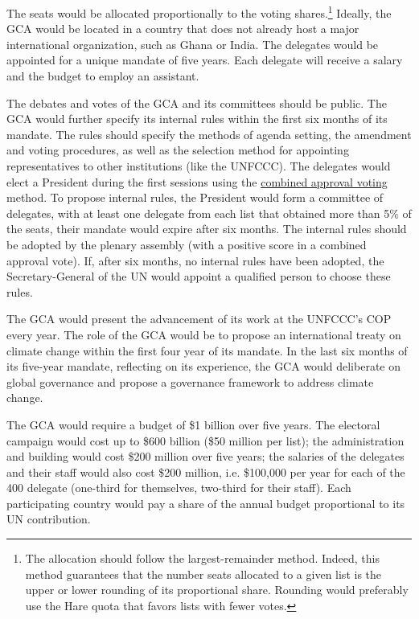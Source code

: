\documentclass[12pt,english]{article}
\begin{document}
The seats would be allocated proportionally to the voting shares.\footnote{The allocation should follow the largest-remainder method. Indeed, this method guarantees that the number seats allocated to a given list is the upper or lower rounding of its proportional share. Rounding would preferably use the Hare quota that favors lists with fewer votes.} Ideally, the GCA would be located in a country that does not already host a major international organization, such as Ghana or India. The delegates would be appointed for a unique mandate of five years. Each delegate will receive a salary and the budget to employ an assistant. 

The debates and votes of the GCA and its committees should be public. The GCA would further specify its internal rules within the first six months of its mandate. The rules should specify the methods of agenda setting, the amendment and voting procedures, as well as the selection method for appointing representatives to other institutions (like the UNFCCC). The delegates would elect a President during the first sessions using the \href{https://en.wikipedia.org/wiki/Combined_approval_voting}{combined approval voting} method. To propose internal rules, the President would form a committee of delegates, with at least one delegate from each list that obtained more than 5\% of the seats, their mandate would expire after six months. The internal rules should be adopted by the plenary assembly (with a positive score in a combined approval vote). If, after six months, no internal rules have been adopted, the Secretary-General of the UN would appoint a qualified person to choose these rules. 

The GCA would present the advancement of its work at the UNFCCC's COP every year. The role of the GCA would be to propose an international treaty on climate change within the first four year of its mandate. In the last six months of its five-year mandate, reflecting on its experience, the GCA would deliberate on global governance and propose a governance framework to address climate change.

The GCA would require a budget of \$1 billion over five years. The electoral campaign would cost up to \$600 billion (\$50 million per list); the administration and building would cost \$200 million over five years; the salaries of the delegates and their staff would also cost \$200 million, i.e. \$100,000 per year for each of the 400 delegate (one-third for themselves, two-third for their staff). Each participating country would pay a share of the annual budget proportional to its UN contribution. 
\end{document}
